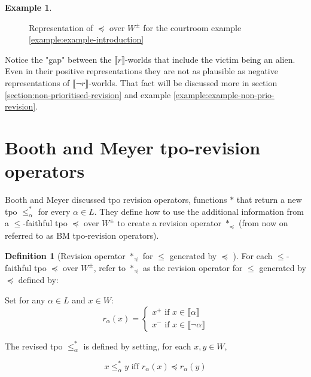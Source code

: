 \documentclass[english, 12pt]{scrartcl}
\theoremstyle{definition}
\newtheorem{example}{Example}
\theoremstyle{definition}
\newtheorem{definition}{Definition}
\theoremstyle{definition}
\newcommand{\modelsOf}[1]{\llbracket #1 \rrbracket}
\begin{document}
\begin{example}
\begin{figure}[H]
            \caption{Representation of $\preceq$ over $W^{\pm}$ for the courtroom example \ref{example:example-introduction}}
            \label{fig:example-tpo-initial}
    \end{figure}
    
    Notice the "gap" between the $\modelsOf{r}$-worlds that include the victim being an alien. Even in their positive representations they are not as plausible as negative representations of $\modelsOf{\neg r}$-worlds. That fact will be discussed more in section \ref{section:non-prioritised-revision} and example \ref{example:example-non-prio-revision}.
\end{example}

\section{Booth and Meyer tpo-revision operators}
\label{section:booth-and-meyer-tpo-revision-operators}
Booth and Meyer \cite{Booth2011} discussed tpo revision operators, functions $\ast$ that return a new tpo $\leq_{\alpha}^{\ast}$ for every $\alpha \in L$. They define how to use the additional information from a $\leq$-faithful tpo $\preceq$ over $W^{\pm}$ to create a revision operator $\ast_{\preceq}$ (from now on referred to as BM tpo-revision operators).

\begin{definition}[Revision operator $\ast_{\preceq}$ for $\leq$ generated by $\preceq$ \cite{Booth2011}]
    \label{definition:revision-operator}
    For each $\leq$-faithful tpo $\preceq$ over $W^{\pm}$, refer to $\ast_{\preceq}$ as the revision operator for $\leq$ generated by $\preceq$ defined by:
    
    Set for any $\alpha \in L$ and $x \in W$:
    \begin{equation*}
        r_{\alpha}(x) = \left\{
                    \begin{array}{ll}
                      x^{+} \textrm{ if } x \in \modelsOf{\alpha}\\
                      x^{-} \textrm{ if } x \in \modelsOf{\neg\alpha}
                    \end{array}
                  \right.
    \end{equation*}
    
    The revised tpo $\leq_{\alpha}^{\ast}$ is defined by setting, for each $x, y \in W$,

    \begin{equation*}
        x \leq_{\alpha}^{\ast} y \textrm{ iff } r_{\alpha}(x) \preceq r_{\alpha}(y)
    \end{equation*}
\end{definition}
\end{document}
